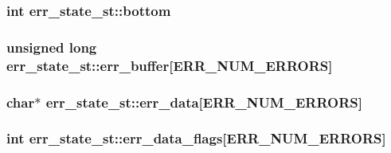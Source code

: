 \subsubsection[{\texorpdfstring{bottom}{bottom}}]{\setlength{\rightskip}{0pt plus 5cm}int err\+\_\+state\+\_\+st\+::bottom}\hypertarget{structerr__state__st_a91a24fe0ee64f2618dac094713874c01}{}\label{structerr__state__st_a91a24fe0ee64f2618dac094713874c01}
\subsubsection[{\texorpdfstring{err\+\_\+buffer}{err_buffer}}]{\setlength{\rightskip}{0pt plus 5cm}unsigned long err\+\_\+state\+\_\+st\+::err\+\_\+buffer\mbox{[}{\bf E\+R\+R\+\_\+\+N\+U\+M\+\_\+\+E\+R\+R\+O\+RS}\mbox{]}}\hypertarget{structerr__state__st_a6093e57e37a565c5c2ade7453856e0b8}{}\label{structerr__state__st_a6093e57e37a565c5c2ade7453856e0b8}
\subsubsection[{\texorpdfstring{err\+\_\+data}{err_data}}]{\setlength{\rightskip}{0pt plus 5cm}char$\ast$ err\+\_\+state\+\_\+st\+::err\+\_\+data\mbox{[}{\bf E\+R\+R\+\_\+\+N\+U\+M\+\_\+\+E\+R\+R\+O\+RS}\mbox{]}}\hypertarget{structerr__state__st_a75311ccdf3c5e3ab976b6b134e4ea4de}{}\label{structerr__state__st_a75311ccdf3c5e3ab976b6b134e4ea4de}
\subsubsection[{\texorpdfstring{err\+\_\+data\+\_\+flags}{err_data_flags}}]{\setlength{\rightskip}{0pt plus 5cm}int err\+\_\+state\+\_\+st\+::err\+\_\+data\+\_\+flags\mbox{[}{\bf E\+R\+R\+\_\+\+N\+U\+M\+\_\+\+E\+R\+R\+O\+RS}\mbox{]}}\hypertarget{structerr__state__st_a929c4ef844d860715e5df4935630f23c}{}\label{structerr__state__st_a929c4ef844d860715e5df4935630f23c}
